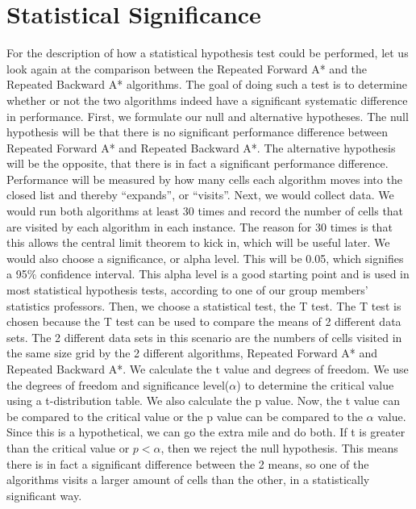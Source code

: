 \documentclass{article}
\begin{document}
\section{Statistical Significance}
For the description of how a statistical hypothesis test could be performed, let us look again at the comparison between the Repeated Forward A* and the Repeated Backward A* algorithms. The goal of doing such a test is to determine whether or not the two algorithms indeed have a significant systematic difference in performance.
\newline
\newline
First, we formulate our null and alternative hypotheses. The null hypothesis will be that there is no significant performance difference between Repeated Forward A* and Repeated Backward A*. The alternative hypothesis will be the opposite, that there is in fact a significant performance difference. Performance will be measured by how many cells each algorithm moves into the closed list and thereby “expands”, or “visits”.
\newline
\newline
Next, we would collect data. We would run both algorithms at least 30 times and record the number of cells that are visited by each algorithm in each instance. The reason for 30 times is that this allows the central limit theorem to kick in, which will be useful later. We would also choose a significance, or alpha level. This will be 0.05, which signifies a 95\% confidence interval. This alpha level is a good starting point and is used in most statistical hypothesis tests, according to one of our group members’ statistics professors.
\newline
\newline
Then, we choose a statistical test, the T test. The T test is chosen because the T test can be used to compare the means of 2 different data sets. The 2 different data sets in this scenario are the numbers of cells visited in the same size grid by the 2 different algorithms, Repeated Forward A* and Repeated Backward A*.
\newline
\newline
We calculate the t value and degrees of freedom. We use the degrees of freedom and significance level($\alpha$) to determine the critical value using a t-distribution table. We also calculate the p value. 
\newline
\newline
Now, the t value can be compared to the critical value or the p value can be compared to the $\alpha$ value. Since this is a hypothetical, we can go the extra mile and do both. If t is greater than the critical value or \( p < \alpha \), then we reject the null hypothesis. This means there is in fact a significant difference between the 2 means, so one of the algorithms visits a larger amount of cells than the other, in a statistically significant way.
\end{document}
